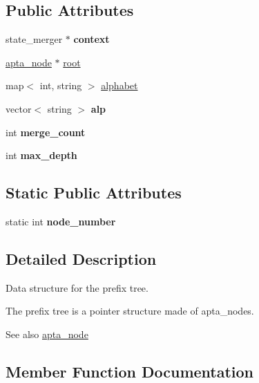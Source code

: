 \subsection*{Public Attributes}
\begin{DoxyCompactItemize}
\item 
\mbox{\label{classapta_a2625cd63c4d06610ec690bf82480359e}} 
state\+\_\+merger $\ast$ {\bfseries context}
\item 
\hyperlink{classapta__node}{apta\+\_\+node} $\ast$ \hyperlink{classapta_a96e4359fad19dafce95f0a3086c44a73}{root}
\item 
map$<$ int, string $>$ \hyperlink{classapta_a36490cd60aae771985948b4defdf6bcb}{alphabet}
\item 
\mbox{\label{classapta_a1db724ff80e7d371d69dc0ad877e839c}} 
vector$<$ string $>$ {\bfseries alp}
\item 
\mbox{\label{classapta_a01190956e1295981ba35e993d3d83941}} 
int {\bfseries merge\+\_\+count}
\item 
\mbox{\label{classapta_a68c2d115bd743fd4bafd415885225c47}} 
int {\bfseries max\+\_\+depth}
\end{DoxyCompactItemize}
\subsection*{Static Public Attributes}
\begin{DoxyCompactItemize}
\item 
\mbox{\label{classapta_a5517fefa20907045b4d438ff15f6f4d5}} 
static int {\bfseries node\+\_\+number}
\end{DoxyCompactItemize}


\subsection{Detailed Description}
Data structure for the prefix tree. 

The prefix tree is a pointer structure made of apta\+\_\+nodes. \begin{DoxySeeAlso}{See also}
\hyperlink{classapta__node}{apta\+\_\+node} 
\end{DoxySeeAlso}


\subsection{Member Function Documentation}
\mbox{\label{classapta_a244ffcaf3ff27062eec5463d26033ac8}} 
